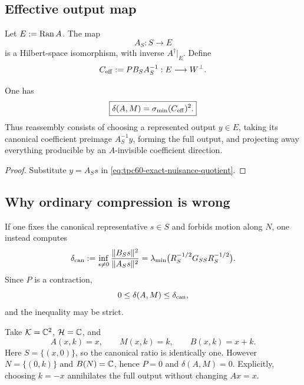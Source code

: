 \subsection{Effective output map}

Let \(E:=\operatorname{Ran} A\).  The map
\begin{equation}
 A_S:S\longrightarrow E
 \label{eq:tpc60-AS-bijection}
\end{equation}
is a Hilbert-space isomorphism, with inverse \(A^\dagger|_E\).  Define
\begin{equation}
 C_{\rm eff}:=PB_SA_S^{-1}:E\longrightarrow W^\perp.
 \label{eq:tpc60-effective-map}
\end{equation}

\begin{corollary}
\label{cor:tpc60-effective-singular-value}
One has
\begin{equation}
 \boxed{
 \delta(A,M)=\sigma_{\min}(C_{\rm eff})^2.}
 \label{eq:tpc60-effective-singular-value}
\end{equation}
Thus reassembly consists of choosing a represented output \(y\in E\),
taking its canonical coefficient preimage \(A_S^{-1}y\), forming the full
output, and projecting away everything producible by an \(A\)-invisible
coefficient direction.
\end{corollary}

\begin{proof}
Substitute \(y=A_Ss\) in
\eqref{eq:tpc60-exact-nuisance-quotient}.
\end{proof}

\subsection{Why ordinary compression is wrong}

If one fixes the canonical representative \(s\in S\) and forbids motion
along \(N\), one instead computes
\begin{equation}
 \delta_{\rm can}
 :=\inf_{s\ne0}\frac{\|B_Ss\|^2}{\|A_Ss\|^2}
 =\lambda_{\min}
   \bigl(R_S^{-1/2}G_{SS}R_S^{-1/2}\bigr).
 \label{eq:tpc60-naive-canonical-constant}
\end{equation}
Since \(P\) is a contraction,
\begin{equation}
 0\le\delta(A,M)\le\delta_{\rm can},
 \label{eq:tpc60-short-less-compression}
\end{equation}
and the inequality may be strict.

\begin{example}
\label{ex:tpc60-naive-compression-fails}
Take \(\mathcal K=\mathbb C^2\), \(\mathcal H=\mathbb C\), and
\begin{equation}
 A(x,k)=x,
 \qquad M(x,k)=k,
 \qquad B(x,k)=x+k.
 \label{eq:tpc60-basic-counterexample}
\end{equation}
Here \(S=\{(x,0)\}\), so the canonical ratio is identically one.  However
\(N=\{(0,k)\}\) and \(B(N)=\mathbb C\), hence \(P=0\) and
\(\delta(A,M)=0\).  Explicitly, choosing \(k=-x\) annihilates the full
output without changing \(Ax=x\).
\end{example}

